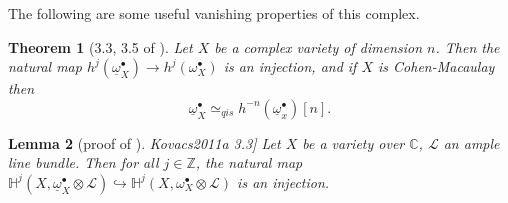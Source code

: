 \documentclass[proquest]{uwthesis}[2014/11/13]
\newtheorem{theorem}{Theorem}[section]
\newtheorem{prop}[theorem]{Proposition}
\newtheorem{lemma}[theorem]{Lemma}
\theoremstyle{definition}
\DeclareMathOperator{\Hom}{Hom}
\newcommand{\CC}{\mathbb{C}}
\newcommand{\EE}{\mathscr{E}}
\newcommand{\HH}{\mathbb{H}}
\newcommand{\LL}{\mathcal{L}}
\newcommand{\OO}{\mathcal{O}}
\newcommand{\qis}{\simeq_{qis}}
\newcommand{\bR}{\textbf{R}}
\newcommand{\ZZ}{\mathbb{Z}}
\newcommand{\db}{\underline{\omega}^\bullet}
\begin{document}
The following are some useful vanishing properties of this complex.

\begin{theorem}[3.3, 3.5 of \cite{Kovacs2011a}]
	\label{thm:duboisgr}
	Let $X$ be a complex variety of dimension $n$.
	Then the natural map $h^j (\db_X) \rightarrow h^j (\omega_X^\bullet)$ is an injection, and if $X$ is Cohen-Macaulay then
	\[
		\db_X \qis h^{-n} (\db_x)[n].
	\]
\end{theorem}

	

\begin{lemma}[proof of \cite[3.3]{Kovacs2011a} 3.3]
	Let $X$ be a variety over $\CC$, $\LL$ an ample line bundle.
	Then for all $j \in \ZZ$, the natural map
	$\HH^j(X, \db_X \otimes \LL) \hookrightarrow \HH^j(X,\omega_X^\bullet \otimes \LL)$ is an injection.
\end{lemma}
\end{document}
